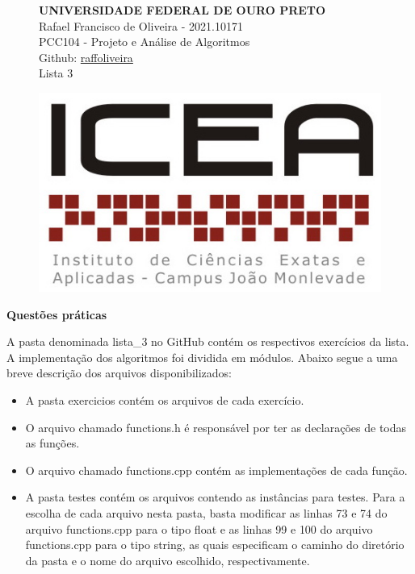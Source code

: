 \documentclass[12pt,a4paper]{article}
\begin{document}
\begin{figure}[H]
\begin{minipage}[]{0.07\linewidth}
	\end{minipage}
\hfill
	\begin{minipage}[]{0.6\linewidth}
		\centering
	\textbf{UNIVERSIDADE FEDERAL DE OURO PRETO\\}
		Rafael Francisco de Oliveira - 2021.10171\\
		PCC104 - Projeto e Análise de Algoritmos\\
		Github: \href{https://github.com/raffoliveira/Master_Degree}{raffoliveira}\\
		Lista 3
		
	\end{minipage}
\hfill	
	\begin{minipage}[c]{0.15\linewidth}
	\includegraphics[width=\linewidth]{images/icea.jpg}	
	\end{minipage}

\vspace{0.5cm}
\hrulefill
\end{figure}

{\Large \textbf{Questões práticas}}

\vspace{0.5cm}

A pasta denominada \textsf{lista\_3} no GitHub contém os respectivos exercícios da lista. A implementação dos algoritmos foi dividida em módulos. Abaixo segue a uma breve descrição dos arquivos disponibilizados:

\begin{itemize}
	\item A pasta \textsf{exercicios} contém os arquivos de cada exercício.
	\item O arquivo chamado \textsf{functions.h} é responsável por ter as declarações de todas as funções.
	\item O arquivo chamado \textsf{functions.cpp} contém as implementações de cada função. 
	\item A pasta \textsf{testes} contém os arquivos contendo as instâncias para testes. Para a escolha de cada arquivo nesta pasta, basta modificar as linhas \textsf{73} e \textsf{74} do arquivo \textsf{functions.cpp}  para o tipo \textsf{float} e as linhas \textsf{99} e \textsf{100} do arquivo \textsf{functions.cpp}  para o tipo \textsf{string}, as quais especificam o caminho do diretório da pasta e o nome do arquivo escolhido, respectivamente. 
\end{itemize}
\end{document}
